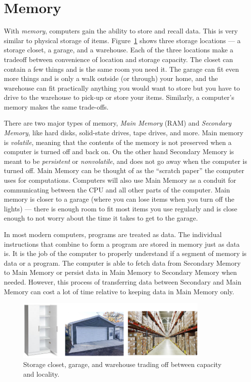 \section{Memory}

With \emph{memory}, computers gain the ability to store and recall data. This is very
similar to physical storage of items. Figure~\ref{fig:hardware:storage} shows
three storage locations --- a storage closet, a garage, and a warehouse. Each of
the three locations make a tradeoff between convenience of location and storage
capacity. The closet can contain a few things and is the same room you need it.
The garage can fit even more things and is only a walk outside (or through) your
home, and the warehouse can fit practically anything you would want to store but
you have to drive to the warehouse to pick-up or store your items. Similarly, a
computer's memory makes the same trade-offs.

There are two major types of memory, \emph{Main Memory} (RAM) and \emph{Secondary Memory},
like hard disks, solid-state drives, tape drives, and more. Main memory is \emph{volatile},
meaning that the contents of the memory is not preserved when a computer is
turned off and back on. On the other hand Secondary Memory is meant to be
\emph{persistent} or \emph{nonvolatile}, and does not go away when the computer is turned off. Main Memory
can be thought of as the ``scratch paper'' the computer uses for computations.
Computers will also use Main Memory as a conduit for communicating between the
CPU and all other parts of the computer. Main memory is closer to a garage
(where you can lose items when you turn off the lights) --- there is enough room
to fit most items you use regularly and is close enough to not worry about the
time it takes to get to the garage.

In most modern computers,
programs are treated as data. The individual instructions that combine
to form a program are stored in memory just as data is. It is the job of the
computer to properly understand if a segment of memory is data or a program.
The computer is able to fetch data from Secondary Memory to Main Memory or
persist data in Main Memory to Secondary Memory when needed. However,
this process of transferring data between Secondary and Main Memory can
cost a lot of time relative to keeping data in Main Memory only.

\begin{figure}
	\centering
	\includegraphics[width=0.85\textwidth]{images/storage.png}
	\caption{Storage closet, garage, and warehouse trading off between
                 capacity and locality. }
	\label{fig:hardware:storage}
\end{figure}

